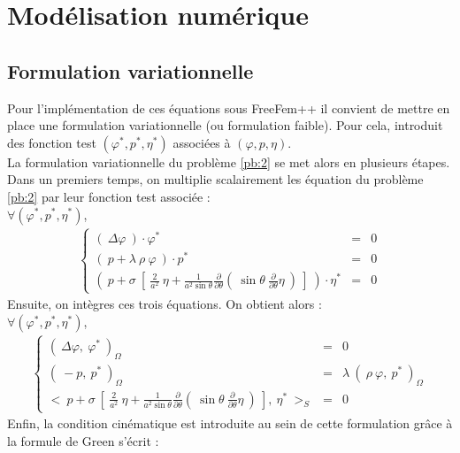 \documentclass[a4paper]{report}
\begin{document}
\section{Modélisation numérique}
\subsection{Formulation variationnelle}
Pour l'implémentation de ces équations sous FreeFem++ il convient de mettre en place une formulation variationnelle (ou formulation faible). Pour cela, introduit des fonction test $(\varphi^*, p^*, \eta^*)$ associées à $(\varphi, p, \eta)$.
\\[0.25cm]
La formulation variationnelle du problème \eqref{pb:2} se met alors en plusieurs étapes. Dans un premiers temps, on multiplie scalairement les équation du problème \eqref{pb:2} par leur fonction test associée :
\\[0.25cm]
$\forall (\varphi^*, p^*, \eta^*)$,
\begin{eqnarray*}
\left\{
\begin{array}{rcl}
\left(\ \Delta \varphi\ \right) \cdot \varphi^* &=& 0 \\
\left(\ p + \lambda\ \rho\ \varphi\ \right) \cdot p^* &=& 0 \\
\left(\ p + \sigma\ \left[\ \frac{2}{a^2} \ \eta
                    + \frac{1}{a^2 \sin\theta} \frac{\partial}{\partial \theta}(\ \sin\theta \ \frac{\partial}{\partial \theta} \eta \ )\ \right]\ \right) \cdot \eta^* &=& 0
\end{array}
\right.
\end{eqnarray*}
Ensuite, on intègres ces trois équations. On obtient alors :
\\[0.25cm]
$\forall (\varphi^*, p^*, \eta^*)$,
\begin{eqnarray*}
\left\{
\begin{array}{rcl}
(\ \Delta \varphi ,\ \varphi^* \ )_\Omega &=& 0 \\
(\ - p ,\ p^* \ )_\Omega &=& \lambda\ (\ \rho\ \varphi ,\ p^* \ )_\Omega \\
<\ p + \sigma\ \left[\ \frac{2}{a^2} \ \eta
                       + \frac{1}{a^2 \sin\theta} \frac{\partial}{\partial \theta}(\ \sin\theta \ \frac{\partial}{\partial \theta} \eta \ )\ \right] ,\ \eta^* \ >_S &=& 0
\end{array}
\right.
\end{eqnarray*}
Enfin, la condition cinématique est introduite au sein de cette formulation grâce à la formule de Green s'écrit :
\end{document}
